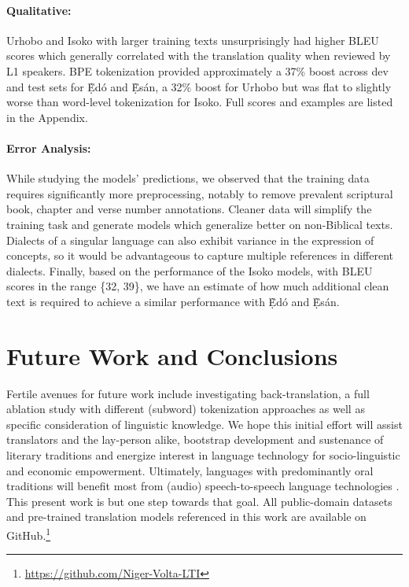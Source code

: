 \documentclass{article} %
\begin{document}
\paragraph{Qualitative:} Urhobo and Isoko with larger training texts unsurprisingly had higher BLEU scores which generally correlated with the translation quality when reviewed by L1 speakers. BPE tokenization provided approximately a 37\% boost across dev and test sets for \d{\`E}d{\'o} and \d{\`E}s{\'a}n, a 32\% boost for Urhobo but was flat to slightly worse than word-level tokenization for Isoko. Full scores and examples are listed in the Appendix.

\paragraph{Error Analysis:} While studying the models' predictions, we observed that the training data requires significantly more preprocessing, notably to remove prevalent scriptural book, chapter and verse number annotations. Cleaner data will simplify the training task and generate models which generalize better on non-Biblical texts. Dialects of a singular language can also exhibit variance in the expression of concepts, so it would be advantageous to capture multiple references in different dialects. Finally, based on the performance of the Isoko models, with BLEU scores in the range \{32, 39\}, we have an estimate of how much additional clean text is required to achieve a similar performance with \d{\`E}d{\'o} and \d{\`E}s{\'a}n.

\section{Future Work and Conclusions}
Fertile avenues for future work include investigating back-translation, a full ablation study with different (subword) tokenization approaches as well as specific consideration of linguistic knowledge. We hope this initial effort will assist translators and the lay-person alike, bootstrap development and sustenance of literary traditions and energize interest in language technology for socio-linguistic and economic empowerment. Ultimately, languages with predominantly oral traditions will benefit most from (audio) speech-to-speech language technologies \citep{jia2019direct}. This present work is but one step towards that goal. All public-domain datasets and pre-trained translation models referenced in this work are available on GitHub.\footnote{\url{https://github.com/Niger-Volta-LTI}}
 
\end{document}
